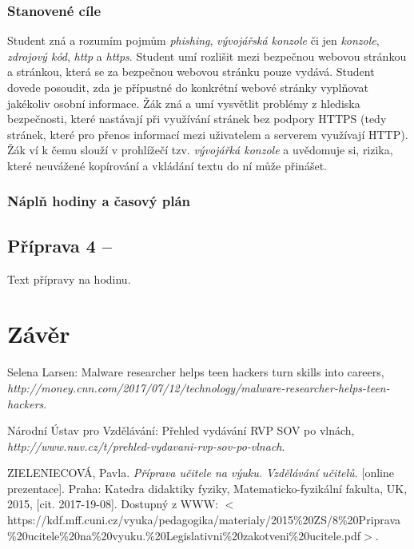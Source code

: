\documentclass[a4paper, 12pt]{article}
\begin{document}
\subsubsection{Stanovené cíle}
Student zná a rozumím pojmům \textit{phishing}, \textit{vývojářská konzole} či jen \textit{konzole}, \textit{zdrojový kód}, \textit{http} a \textit{https}. Student umí rozlišit mezi bezpečnou webovou stránkou a stránkou, která se za bezpečnou webovou stránku pouze vydává. Student dovede posoudit, zda je přípustné do konkrétní webové stránky vyplňovat jakékoliv osobní informace. Žák zná a umí vysvětlit problémy z hlediska bezpečnosti, které nastávají při využívání stránek bez podpory HTTPS (tedy stránek, které pro přenos informací mezi uživatelem a serverem využívají HTTP). Žák ví k čemu slouží v prohlížečí tzv. \textit{vývojářká konzole} a uvědomuje si, rizika, které neuvážené kopírování a vkládání textu do ní může přinášet.

\subsubsection{Náplň hodiny a časový plán}


\subsection{Příprava 4 -- }
Text přípravy na hodinu.

\newpage
\section{Závěr}







\newpage
\begin{thebibliography}{9}

    Selena Larsen: Malware researcher helps teen hackers turn skills into careers,
    \\\textit{http://money.cnn.com/2017/07/12/technology/malware-researcher-helps-teen-hackers}.

    Národní Ústav pro Vzdělávání: Přehled vydávání RVP SOV po vlnách,
    \\\textit{http://www.nuv.cz/t/prehled-vydavani-rvp-sov-po-vlnach}.

    ZIELENIECOVÁ, Pavla. \textit{Příprava učitele na výuku. Vzdělávání učitelů.} [online prezentace]. Praha: Katedra didaktiky fyziky, Matematicko-fyzikální fakulta, UK, 2015, [cit. 2017-19-08]. Dostupný z WWW: $<$https://kdf.mff.cuni.cz/vyuka/pedagogika/materialy/2015\%20ZS/8\%20Priprava\\\%20ucitele\%20na\%20vyuku.\%20Legislativni\%20zakotveni\%20ucitele.pdf$>$.

\end{thebibliography}
\end{document}
